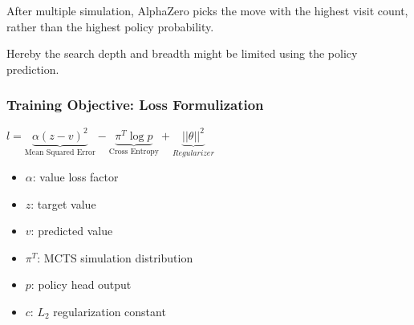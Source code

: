 \documentclass[
../../EiKI_Summary.tex,
]
{subfiles}
\begin{document}
After multiple simulation, AlphaZero picks the move with the highest visit count, rather than the highest policy probability.

Hereby the search depth and breadth might be limited using the policy prediction.

\subsubsection{Training Objective: Loss Formulization}
\begin{csmb*}
    $l = \underbrace{\alpha(z-v)^2}_{\text{Mean Squared Error}}-\underbrace{\pi^T\log p}_{\text{Cross Entropy}} + \underbrace{||\theta||^2}_{Regularizer}$
\end{csmb*}

\begin{itemize}
    \item $\alpha$: value loss factor
    \item $z$: target value
    \item $v$: predicted value
    \item $\pi^T$: MCTS simulation distribution
    \item $p$: policy head output
    \item $c$: $L_2$ regularization constant
\end{itemize}
\end{document}
